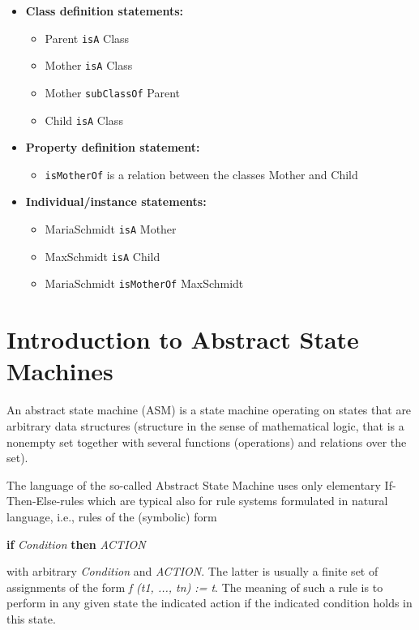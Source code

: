 \begin{itemize}
	\item \textbf {Class definition statements:}
	\begin{itemize}
		\item Parent \texttt{isA} Class
		\item Mother \texttt{isA} Class
		\item Mother \texttt{subClassOf} Parent
		\item Child \texttt{isA} Class
	\end{itemize}
	\item \textbf {Property definition statement:}
	\begin{itemize}
		\item \texttt{isMotherOf} is a relation between the classes Mother and Child
	\end{itemize}
	\item \textbf{Individual/instance statements:}
	\begin{itemize}
		\item MariaSchmidt \texttt{isA} Mother
		\item MaxSchmidt \texttt{isA} Child
		\item MariaSchmidt \texttt{isMotherOf} MaxSchmidt
	\end{itemize}
\end{itemize}

\section{Introduction to Abstract State Machines }

An abstract state machine (ASM) is a state machine operating on states that are arbitrary data structures (structure in the sense of mathematical logic, that is a nonempty set together with several functions (operations) and relations over the set).

The language of the so-called Abstract State Machine uses only elementary If-Then-Else-rules which are typical also for rule systems formulated in natural language, i.e., rules of the (symbolic) form 

\medskip
\textbf{if} \textit{Condition} \textbf{then} \textit{ACTION}
\medskip

with arbitrary \textit{Condition} and \textit{ACTION}. The latter is usually a finite set of assignments of the form \textit{f (t1, ..., tn) := t}. The meaning of such a rule is to perform in any given state the indicated action if the indicated condition holds in this state.

